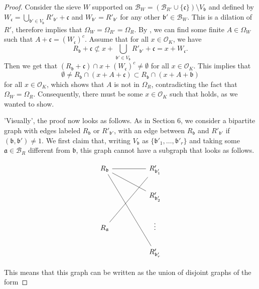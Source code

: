 \documentclass[a4paper,11pt,reqno]{amsart}
\theoremstyle{plain}
\theoremstyle{remark}
\newcommand{\cb}{\mathcal{B}}
\newcommand{\co}{\mathcal{O}}
\newcommand{\ga}{\mathfrak{a}}
\newcommand{\gb}{\mathfrak{b}}
\newcommand{\gc}{\mathfrak{c}}
\begin{document}
\begin{proof}
				Consider the sieve $W$ supported on $\cb_W = (\cb_{R'}\cup\{\gc\})\setminus V_\gb$ and defined by $W_\gc = \bigcup_{\gb' \in V_\gb} R'_{\gb'} + \gc$ and $W_{\gb'} = R'_{\gb'}$ for any other $\gb' \in \cb_W$. This is a dilation of $R'$, therefore  implies that $\Omega_W = \Omega_{R'} = \Omega_{R}$. By , we can find some finite $A \in \Omega_W$ such that $A+\gc = (W_\gc)^c$. Assume that for all $x\in \co_K$, we have $$R_\gb +\gc \not \subset x+ \bigcup_{\gb' \in V_\gb} R'_{\gb'} + \gc =  x + W_\gc.$$ Then we get that $(R_\gb + \gc) \cap x + (W_\gc)^c \neq \emptyset$ for all $x\in \co_K$. This implies that $$\emptyset \neq R_\gb \cap (x+A+\gc) \subset R_\gb \cap (x+A+\gb) $$ for all $x\in \co_K$, which shows that $A$ is not in $\Omega_{R}$, contradicting the fact that $\Omega_W = \Omega_{R}$. Consequently, there must be some $x\in\co_K$ such that  holds, as we wanted to show.
				
				'Visually', the proof now looks as follows. As in Section 6, we consider a bipartite graph with edges labeled $R_\gb$ or $R'_{\gb'}$, with an edge between $R_\gb$ and  $R'_{\gb'}$ if $(\gb,\gb') \neq 1$. We first claim that, writing $V_\gb$ as $\{\gb'_1,\dots,\gb'_r\}$ and taking some $\ga \in \cb_R$ different from $\gb$, this graph cannot have a subgraph that looks as follows.
				
				\[\begin{tikzcd}
					{R_\gb} && {R'_{\gb'_1}} \\
					&& {R'_{\gb'_2}} \\
					{R_\ga} && \vdots \\
					&& {R'_{\gb'_r}}
					\arrow[no head, from=1-1, to=1-3]
					\arrow[no head, from=1-3, to=3-1]
					\arrow[no head, from=2-3, to=1-1]
					\arrow[no head, from=4-3, to=1-1]
				\end{tikzcd}\]
				
				This means that this graph can be written as the union of disjoint graphs of the form 
				

\end{proof}
\end{document}
